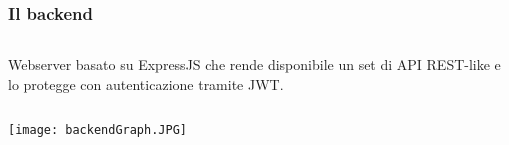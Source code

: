 \begin{frame}
  \frametitle{Il backend}
  \begin{column}{0.4\textwidth}
    Webserver basato su ExpressJS che rende disponibile un set di API REST-like e lo protegge con autenticazione tramite JWT.
  \end{column}
  \begin{column}{0.6\textwidth}
    \texttt{[image: backendGraph.JPG]}
  \end{column}	
\end{frame}
